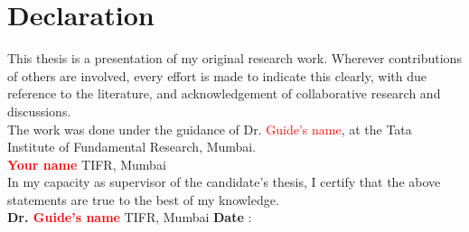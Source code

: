 \chapter[Declaration]{\centering Declaration}
This thesis is a presentation of my original research work. Wherever contributions of others are involved, every effort is made to indicate this clearly, with due reference to the literature, and acknowledgement of collaborative research and discussions. 
\\[1\baselineskip]
The work was done under the guidance of Dr. \textcolor{red}{Guide's name}, at the Tata Institute of Fundamental Research, Mumbai.
\\[3\baselineskip]
\null\hfill \textcolor{red}{\textbf{ Your name}}\newline
\null\hfill TIFR, Mumbai
\\[2\baselineskip]
In my capacity as supervisor of the candidate’s thesis, I certify that the above statements are true to the best of my knowledge.
\\[3\baselineskip]
\null\hfill \textbf{Dr. \textcolor{red}{Guide's name}}\newline
\null\hfill  TIFR, Mumbai \newline
\null\hfill \textbf{Date} : \qquad\qquad\qquad\qquad\qquad